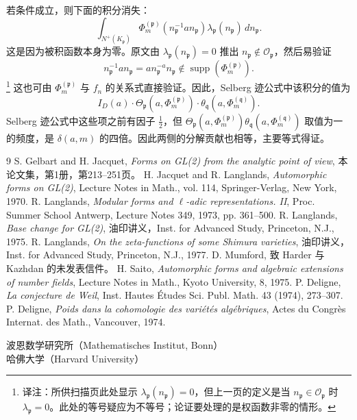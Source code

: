 若条件成立，则下面的积分消失：
\[
\int_{N^+(K_{\mathfrak p})}
\Phi_m^{(\mathfrak p)}(n_{\mathfrak p}^{-1}an_{\mathfrak p})
\lambda_{\mathfrak p}(n_{\mathfrak p})\,dn_{\mathfrak p}.
\]
这是因为被积函数本身为零。原文由
$\lambda_{\mathfrak p}(n_{\mathfrak p})=0$ 推出
$n_{\mathfrak p}\notin\mathcal O_{\mathfrak p}$，然后易验证
\[
n_{\mathfrak p}^{-1}an_{\mathfrak p}
=an_{\mathfrak p}^{-a}n_{\mathfrak p}
\notin\operatorname{supp}(\Phi_m^{(\mathfrak p)}).
\]
\footnote{译注：所供扫描页此处显示 $\lambda_{\mathfrak p}(n_{\mathfrak p})=0$，但上一页的定义是当 $n_{\mathfrak p}\in\mathcal O_{\mathfrak p}$ 时 $\lambda_{\mathfrak p}=0$。此处的等号疑应为不等号；论证要处理的是权函数非零的情形。}
这也可由 $\Phi_m^{(\mathfrak p)}$ 与 $f_n$ 的关系式直接验证。因此，Selberg 迹公式中该积分的值为
\[
I_D(a)\cdot\Theta_{\mathfrak p}(a,\Phi_m^{(\mathfrak p)})
\cdot\theta_{\mathfrak q}(a,\Phi_m^{(\mathfrak q)}).
\]
Selberg 迹公式中这些项之前有因子 $\frac12$，但
$\Theta_{\mathfrak p}(a,\Phi_m^{(\mathfrak p)})\theta_{\mathfrak q}(a,\Phi_m^{(\mathfrak q)})$
取值为一的频度，是 $\delta(a,m)$ 的四倍。因此两侧的分解贡献也相等，主要等式得证。
\begin{thebibliography}{9}
 S. Gelbart and H. Jacquet, \textit{Forms on GL(2) from the analytic point of view}, 本论文集，第1册，第213--251页。
 H. Jacquet and R. Langlands, \textit{Automorphic forms on GL(2)}, Lecture Notes in Math., vol. 114, Springer-Verlag, New York, 1970.
 R. Langlands, \textit{Modular forms and $\ell$-adic representations. II}, Proc. Summer School Antwerp, Lecture Notes 349, 1973, pp. 361--500.
 R. Langlands, \textit{Base change for GL(2)}, 油印讲义，Inst. for Advanced Study, Princeton, N.J., 1975.
 R. Langlands, \textit{On the zeta-functions of some Shimura varieties}, 油印讲义，Inst. for Advanced Study, Princeton, N.J., 1977.
 D. Mumford, 致 Harder 与 Kazhdan 的未发表信件。
 H. Saito, \textit{Automorphic forms and algebraic extensions of number fields}, Lecture Notes in Math., Kyoto University, 8, 1975.
 P. Deligne, \textit{La conjecture de Weil}, Inst. Hautes Études Sci. Publ. Math. 43 (1974), 273--307.
 P. Deligne, \textit{Poids dans la cohomologie des variétés algébriques}, Actes du Congrès Internat. des Math., Vancouver, 1974.
\end{thebibliography}
\begin{flushleft}\small 波恩数学研究所（Mathematisches Institut, Bonn）\\哈佛大学（Harvard University）\end{flushleft}
